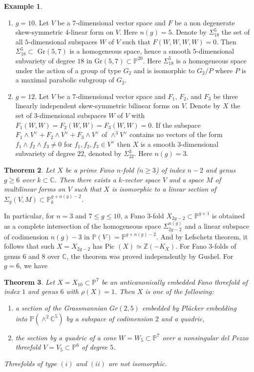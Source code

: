 \documentclass[11pt]{amsart}
\theoremstyle{plain}
\newtheorem{theorem}{Theorem}[section]
\theoremstyle{definition}
\newtheorem{example}[theorem]{Example}
\theoremstyle{expl}
\begin{document}
\begin{example}
\begin{enumerate}
            \item[(iv)] $g=10$. Let $V$ be a $7$-dimensional vector space and $F$ be a non degenerate skew-symmetric $4$-linear form on $V$. Here $n(g)=5$. Denote by $\Sigma_{18}^5$ the set of all $5$-dimensional subspaces $W$ of $V$ such that $F(W,W,W,W)=0$. Then $\Sigma_{18}^5 \subset $ Gr$(5,7)$ is a homogeneous space, hence a smooth $5$-dimensional subvariety of degree $18$ in Gr$(5,7) \subset \mathbb{P}^{20}$. Here $\Sigma^5_{18}$ is a homogeneous space under the action of a group of type $G_2$ and is isomorphic to $G_2/P$ where $P$ is a maximal parabolic subgroup of $G_2$.
            
            \item[(v)] $g=12$. Let $V$ be a $7$-dimensional vector space and $F_1$, $F_2$, and $F_3$ be three linearly independent skew-symmetric bilinear forms on $V$. Denote by $X$ the set of $3$-dimensional subspaces $W$ of $V$ with $F_1(W,W)=F_2(W,W)=F_3(W,W)=0$. If the subspace $F_1 \wedge V^{\vee} + F_2 \wedge V^{\vee} + F_3 \wedge V^{\vee}$ of $\wedge^3 V^{\vee}$ contains no vectors of the form $f_1 \wedge f_2 \wedge f_3 \neq 0$ for $f_1, f_2, f_3 \in V^{\vee}$ then $X$ is a smooth $3$-dimensional subvariety of degree $22$, denoted by $\Sigma_{22}^3$. Here $n(g)= 3$.
        \end{enumerate}
\end{example}
\begin{theorem}
    Let $X$ be a prime Fano $n$-fold ($n \geq 3$) of index $n-2$ and genus $g\geq 6$ over $k \subset \mathbb{C}$. Then there exists a $k$-vector space $V$ and a space $M$ of multilinear forms on $V$ such that $X$ is isomorphic to a linear section of $\Sigma_g(V,M) \subset \mathbb{P}^{g+n(g)-2}_k$. 
\end{theorem}
In particular, for $n=3$ and $7 \leq g \leq 10$, a Fano $3$-fold $X_{2g-2} \subset \mathbb{P}^{g+1}$ is obtained as a complete intersection of the homogeneous space $\Sigma_{2g-2}^{n(g)}$ and a linear subspace of codimension $n(g)-3$ in $\mathbb{P}(V) = \mathbb{P}^{g+n(g)-2}$. And by Lefschetz theorem, it follows that such $X=X_{2g-2}$ has Pic $(X) \simeq \mathbb{Z}(-K_X)$.
For Fano $3$-folds of genus $6$ and $8$ over $\mathbb{C}$, the theorem was proved independently by Gushel. For $g=6$, we have  
\begin{theorem}
    Let $X=X_{10} \subset \mathbb{P}^7$ be an anticanonically embedded Fano threefold of index $1$ and genus $6$ with $\rho(X)=1$. Then $X$ is one of the following:
    \begin{enumerate}
        \item[(i)] a section of the Grassmannian $Gr(2,5)$ embedded by Pl\"{u}cker embedding into $\mathbb{P}(\wedge^2 \mathbb{C}^5)$ by a subspace of codimension $2$ and a quadric,
        \item[(ii)] the section by a quadric of a cone $W=W_5 \subset\mathbb{P}^7$ over a nonsingular del Pezzo threefold $V= V_5 \subset \mathbb{P}^6$ of degree $5$.
    \end{enumerate}
    Threefolds of type $(i)$ and $(ii)$ are not isomorphic.
\end{theorem}
\end{document}
